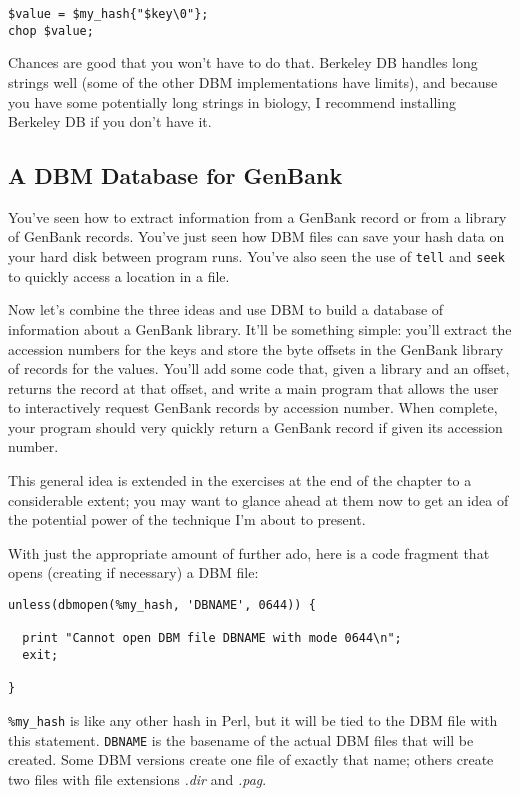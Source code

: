 \begin{lstlisting}
$value = $my_hash{"$key\0"};
chop $value;
\end{lstlisting}

Chances are good that you won't have to do that. Berkeley DB handles long strings well (some of the other DBM implementations have limits), and because you have some potentially long strings in biology, I recommend installing Berkeley DB if you don't have it.

\subsection{A DBM Database for GenBank}
You've seen how to extract information from a GenBank record or from a library of GenBank records. You've just seen how DBM files can save your hash data on your hard disk between program runs. You've also seen the use of \verb|tell| and \verb|seek| to quickly access a location in a file.

Now let's combine the three ideas and use DBM to build a database of information about a GenBank library. It'll be something simple: you'll extract the accession numbers for the keys and store the byte offsets in the GenBank library of records for the values. You'll add some code that, given a library and an offset, returns the record at that offset, and write a main program that allows the user to interactively request GenBank records by accession number. When complete, your program should very quickly return a GenBank record if given its accession number.

This general idea is extended in the exercises at the end of the chapter to a considerable extent; you may want to glance ahead at them now to get an idea of the potential power of the technique I'm about to present.

With just the appropriate amount of further ado, here is a code fragment that opens (creating if necessary) a DBM file: 

\begin{lstlisting}
unless(dbmopen(%my_hash, 'DBNAME', 0644)) {
  
  print "Cannot open DBM file DBNAME with mode 0644\n";
  exit;

}
\end{lstlisting}

\verb|%my_hash| is like any other hash in Perl, but it will be tied to the DBM file with this statement. \verb|DBNAME| is the basename of the actual DBM files that will be created. Some DBM versions create one file of exactly that name; others create two files with file extensions \textit{.dir} and \textit{.pag}.

